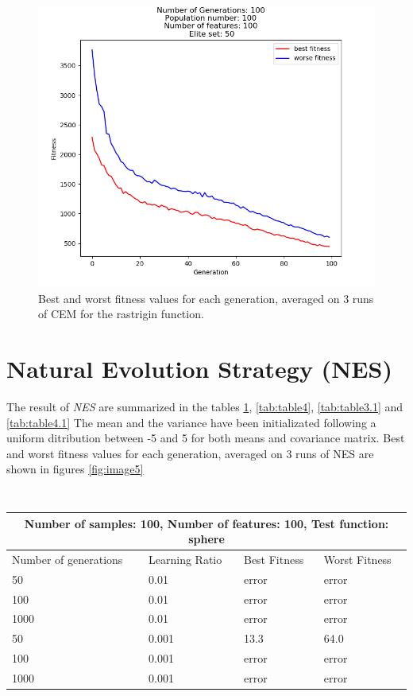 \documentclass{article}
\begin{document}
\begin{figure}
	\centering
	\includegraphics[width=\textwidth]{CEM_d_rastrigin.png}
	\caption{ Best and worst fitness values for each generation, averaged on 3 runs of CEM for the rastrigin function.}
	\label{fig:image4}
\end{figure}

\section{Natural Evolution Strategy (NES)}
The result of  \textit{NES} are summarized in the tables \ref{tab:table3}, \ref{tab:table4}, \ref{tab:table3.1} and \ref{tab:table4.1}  The mean and the variance have been initializated following a uniform ditribution between -5 and 5 for both means and covariance matrix. Best and worst fitness values for each generation, averaged on 3 runs of NES are shown in figures \ref{fig:image5}\\\\

\begin{table}[h]
\begin{tabular}{ |p{3cm}||p{3cm}|p{3cm}|p{3cm}|  }
	\hline
	\multicolumn{4}{|c|}{Number of samples: 100,  Number of features: 100, Test function: sphere} \\
	\hline
	Number of generations& Learning Ratio & Best Fitness & Worst Fitness\\
	\hline
	50   & 0.01    &error&  error\\
	100 &   0.01  & error   & error\\
	1000 & 0.01 & error&  error\\
	50    &0.001 & 13.3& 64.0\\
	100&   0.001  & error& error\\
	1000& 0.001  & error   &error\\
	
	\hline
\end{tabular} 
\caption{\label{tab:table3} }
\end{table}
\end{document}
